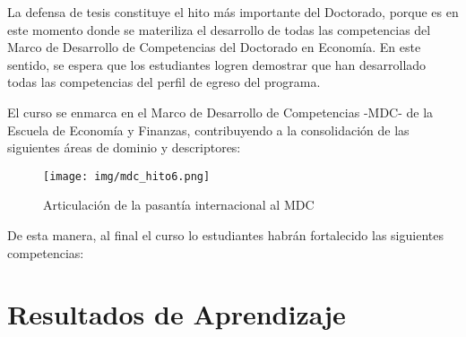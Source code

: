 La defensa de tesis constituye el hito más importante del Doctorado, porque es en este momento donde se materiliza el desarrollo de todas las competencias del Marco de Desarrollo de Competencias del Doctorado en Economía. En este sentido, se espera que los estudiantes logren demostrar que han desarrollado todas las competencias del perfil de egreso del programa.

El curso se enmarca en el Marco de Desarrollo de Competencias -MDC- de la Escuela de Economía y Finanzas, contribuyendo a la consolidación de las siguientes áreas de dominio y descriptores:

\begin{figure}[H]
\caption{Articulación de la pasantía internacional al MDC\label{hito1_mdc} }
\begin{center}
\texttt{[image: img/mdc\_hito6.png]}
\end{center}
\end{figure}

De esta manera, al final el curso lo estudiantes habrán fortalecido las siguientes competencias:

\section{Resultados de Aprendizaje}



